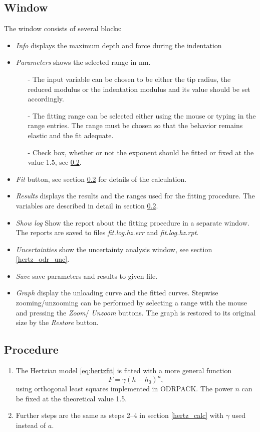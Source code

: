 \subsection{Window}
The window consists of several blocks:
\begin{itemize}
 \item \emph{Info} displays the maximum depth and force during the indentation
 \item \emph{Parameters} shows the selected range in nm. 
        \begin{itemize}
           \item[-] The input variable can be chosen to be either the tip radius, the reduced modulus or the indentation modulus and its value should be set accordingly.
           \item[-] The fitting range can be selected either using the mouse or typing in the range entries. The range must be chosen so that the behavior remains elastic and the fit adequate.
           \item[-] Check box, whether or not the exponent should be fitted or fixed at the value 1.5, see \ref{hertz_odr_calc}.
        \end{itemize}
 \item \emph{Fit} button, see section \ref{hertz_odr_calc} for details of the calculation.
 \item \emph{Results} displays the results and the ranges used for the fitting procedure. 
       The variables are described in detail in section \ref{hertz_odr_calc}.
 \item \emph{Show log} Show the report about the fitting procedure in a separate window.  The reports are saved to files \emph{fit.log.hz.err} and \emph{fit.log.hz.rpt}.
 \item \emph{Uncertainties} show the uncertainty analysis window, see section \ref{hertz_odr_unc}.
 \item \emph{Save} save parameters and results to given file. 
 \item \emph{Graph} display the unloading curve and the fitted curves.  Stepwise zooming/unzooming can be performed by selecting a range with the mouse and pressing the \emph{Zoom}/ \emph{Unzoom} buttons. The graph is restored to its original size by the \emph{Restore} button.
\end{itemize}

\subsection{Procedure} \label{hertz_odr_calc}
\begin{enumerate} 
 \item 
The Hertzian model \eqref{eq:hertzfit} is fitted with a more general function 
\begin{equation} \label{eq:hertzodrfit}
F = \gamma  (h - h_0)^{n},  
\end{equation}
using orthogonal least squares implemented in ODRPACK. 
The power $n$ can be fixed at the theoretical value 1.5.
\item  
Further steps are the same as steps 2--4 in section \ref{hertz_calc} with $\gamma$ used instead of $a$. 
\end{enumerate}
